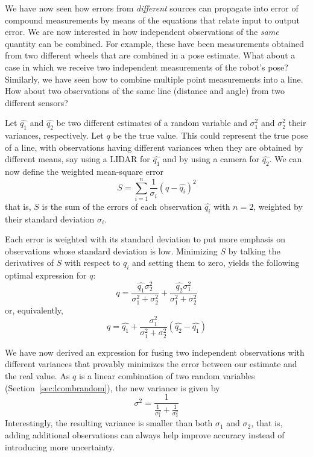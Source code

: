 We have now seen how errors from \emph{different} sources can propagate into error of compound measurements by means of the equations that relate input to output error. We are now interested in how independent observations of the \emph{same} quantity can be combined. For example, these have been measurements obtained from two different wheels that are combined in a pose estimate. What about a case in which we receive two independent measurements of the robot's pose? Similarly, we have seen how to combine multiple point measurements into a line. How about two observations of the same line (distance and angle) from two different sensors? 

Let $ \hat{q_1}$ and $ \hat{q_2}$ be two different estimates of a random variable and $ \sigma^2_1$ and $ \sigma^2_2$ their variances, respectively. Let $ q$ be the true value. This could represent the true pose of a line, with observations having different variances when they are obtained by different means, say using a LIDAR for $ \hat{q_1}$ and by using a camera for $ \hat{q_2}$. We can now define the weighted mean-square error
 \begin{equation}
S=\displaystyle\sum_{i=1}^{n}\frac{1}{\sigma_i} (q-\hat{q_i})^2
\end{equation}
that is, $ S$ is the sum of the errors of each observation $ \hat{q_i}$ with $n=2$, weighted by their standard deviation $ \sigma_i$. 

Each error is weighted  with its standard deviation to put more emphasis on observations whose standard deviation is low. Minimizing  $S$ by talking the derivatives of $S$ with respect to $\hat{q}_i$ and setting them to zero, yields the following optimal expression for $q$:
\begin{equation}
q=\frac{\hat{q_1}\sigma_2^2}{\sigma_1^2+\sigma_2^2}+\frac{\hat{q_2}\sigma_1^2}{\sigma_1^2+\sigma_2^2}
\end{equation}
or, equivalently,
\begin{equation}
q=\hat{q_1}+\frac{\sigma_1^2}{\sigma_1^2+\sigma_2^2}(\hat{q_2}-\hat{q_1})\label{eq:optimalfusion}
\end{equation}

We have now derived an expression for fusing two independent observations with different variances that provably minimizes the error between our estimate and the real value. As $q$ is a linear combination of two random variables (Section~\ref{sec:lcombrandom}), the new variance is given by
\begin{equation}
\sigma^2=\frac{1}{\frac{1}{\sigma_1^2}+\frac{1}{\sigma_2^2}}
\end{equation}
Interestingly, the resulting variance is smaller than both $\sigma_1$ and $\sigma_2$, that is, adding additional observations can always help improve accuracy instead of introducing more uncertainty.

